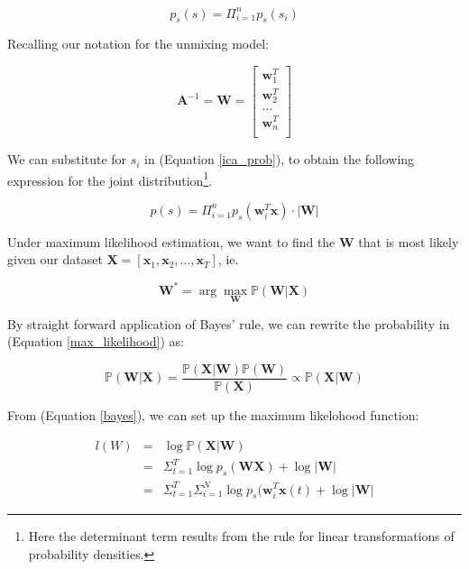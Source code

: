 \documentclass[11pt, oneside, a4paper]{report}
\begin{document}
\begin{equation}
  p_s(s) = \Pi_{i=1}^n p_s(s_i)
  \label{ica_prob}
\end{equation}

Recalling our notation for the unmixing model:

\begin{equation}
  \boldsymbol{A}^{-1} = \boldsymbol{W} = 
  \begin{bmatrix} 
    \boldsymbol{w}_1^T\\ \boldsymbol{w}_2^T\\ ...\\ \boldsymbol{w}_n^T\\
  \end{bmatrix}
\end{equation}

We can substitute for $s_i$ in (Equation \ref{ica_prob}), to obtain the following
expression for the joint distribution\footnote{Here the determinant term results from
the rule for linear transformations of probability densities.}.

\begin{equation}
    p(s) = \Pi_{i=1}^n p_s(\boldsymbol{w}_i^T \boldsymbol{x}) \cdot |\boldsymbol{W}|    
\end{equation}


Under maximum likelihood estimation, we want to find the $\boldsymbol{W}$ that is most likely given our 
dataset $\boldsymbol{X} = [\boldsymbol{x}_1,\boldsymbol{x}_2,...,\boldsymbol{x}_T]$, ie.


\begin{equation}
  \label{max_likelihood}
  \boldsymbol{W}^* = \arg \max_{\boldsymbol{W}} \mathbb{P}(\boldsymbol{W}|\boldsymbol{X})
\end{equation}

By straight forward application of Bayes' rule, we can rewrite the probability in (Equation \ref{max_likelihood}) as:

\begin{equation}
  \label{bayes}
  \mathbb{P}(\boldsymbol{W}|\boldsymbol{X}) 
  = \frac{\mathbb{P}(\boldsymbol{X}|\boldsymbol{W}) \mathbb{P}(\boldsymbol{W})}{\mathbb{P}(\boldsymbol{X})}
  \propto \mathbb{P}(\boldsymbol{X}|\boldsymbol{W})
\end{equation}

From (Equation \ref{bayes}), we can set up the maximum likelohood function:

\begin{equation}\label{ica_loglikelihood}
  \begin{array}{lll}
    l(W) & = &\log \mathbb{P}(\boldsymbol{X}|\boldsymbol{W}) \\
    & = & \Sigma_{t=1}^T \log p_s(\boldsymbol{W}\boldsymbol{X})+\log |\boldsymbol{W}|\\
    & = & \Sigma_{t=1}^T\Sigma_{i=1}^N\log p_s(\boldsymbol{w}_i^T\boldsymbol{x}(t)+\log |\boldsymbol{W}|
  \end{array}
\end{equation}
\end{document}
